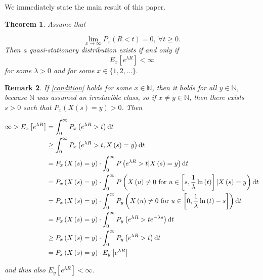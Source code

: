 \documentclass[12pt,a4paper]{scrartcl}
\newtheorem{theorem}{Theorem}[section]
\newtheorem {remark}[theorem]{Remark}
\numberwithin{equation}{section}
\newcommand{\N}{\mathbb{N}} %
\begin{document}
We immediately state the main result of this paper.

\begin{theorem}  \label{maintheorem}
Assume that

\begin{equation} \label{eq:xtoinfty}
\lim_{ x \to \infty} {P_{x}\left(R < t\right)} = 0 , \ \forall t \geq 0.
\end{equation}
Then a quasi-stationary distribution exists if and only if
\begin{equation}
E_{x} \left[e^{\lambda R}\right] < \infty
\label{condition}
\end{equation}
for some $\lambda > 0 $ and for some $ x \in \lbrace 1,2,\ldots \rbrace .$
\end{theorem}

\begin{remark} \label{independentofx}
If \eqref{condition} holds for some $x \in \N$, then it holds for all $y \in \N$, because $\N$ was assumed an irreducible class, so if $ x \neq y \in \N $, then there exists $ s > 0 $ such that $P_x\left(X\left(s\right)=y\right) > 0 $. Then

\begin{align*}
\infty > E_x\left[e^{\lambda R}\right] &= \int_0^{\infty} P_x\left(e^{\lambda R} > t \right) \textnormal{d}t \\
&\geq  \int_0^{\infty} P_x\left(e^{\lambda R} > t, X\left(s\right) = y \right) \textnormal{d}t \\
&= P_x\left(X\left(s\right) = y \right) \cdot \int_0^{\infty} P\left(e^{\lambda R} > t | X\left(s\right) = y \right) \textnormal{d}t \\
&= P_x\left(X\left(s\right) = y \right) \cdot \int_0^{\infty} P\left(X\left(u\right) \neq 0 \text{ for  } u \in \left[s,\frac{1}{\lambda} \ln\left(t\right) \right] | X\left(s\right) = y \right) \textnormal{d}t \\
&= P_x\left(X\left(s\right) = y \right) \cdot \int_0^{\infty} P_y\left(X\left(u\right) \neq 0 \text{ for  } u \in \left[0,\frac{1}{\lambda} \ln\left(t\right) - s \right] \right) \textnormal{d}t \\
&= P_x\left(X\left(s\right) = y \right) \cdot \int_0^{\infty} P_y\left( e^{\lambda R} > t e^{-\lambda s} \right) \textnormal{d}t \\
& \geq P_x\left(X\left(s\right) = y \right) \cdot \int_0^{\infty} P_y\left( e^{\lambda R} > t \right) \textnormal{d}t \\
&= P_x\left(X\left(s\right) = y \right) \cdot E_y\left[e^{\lambda R}\right]
\end{align*}

and thus also $E_y\left[e^{\lambda R}\right] < \infty $.

\end{remark}
\end{document}
